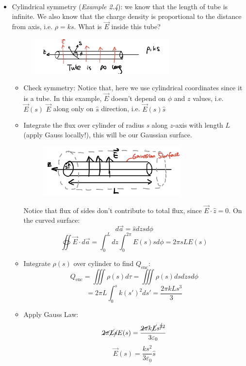 \documentclass[12pt,a4paper,twoside]{article}
\numberwithin{equation}{section}
\begin{document}
\begin{itemize}
        \item Cylindrical symmetry (\textit{Example 2.4}): we know that the length of tube is infinite. We also know that the charge density is proportional to the distance from axis, i.e. $\rho =ks$. What is $\overrightarrow{E}$ inside this tube?
        \begin{figure}[ht]
            \centering
            \includegraphics[width=7.5cm]{250-Revision/gauss-cylinder.png}
        \end{figure}
            \begin{itemize}
                \item Check symmetry:
                    \subitem Notice that, here we use cylindrical coordinates since it is a tube. In this example, $\overrightarrow{E}$ doesn't depend on $\phi$ and $z$ values, i.e. $\overrightarrow{E}(s)$
                    \subitem $\overrightarrow{E}$ along only on $\hat{s}$ direction, i.e. $\overrightarrow{E}(s)\hat{s}$
                \item Integrate the flux over cylinder of radius $s$ along $z$-axis with length $L$ (apply Gauss locally!), this will be our Gaussian surface.
                \begin{figure}[ht]
                    \centering
                    \includegraphics[width=7.5cm]{250-Revision/tube-gaussian-surface.png}
                \end{figure}
                    \subitem Notice that flux of sides don't contribute to total flux, since $\overrightarrow{E}\cdot \hat{z}=0$.
                    \subitem On the curved surface:
                    \[d\overrightarrow{a}=\hat{s}dzsd\phi\]
                    \[\oiint \overrightarrow{E}\cdot d\overrightarrow{a}=\int_{0}^{L}dz\int_{0}^{2\pi}E(s) sd\phi=2\pi sLE(s)\]
                \item Integrate $\rho(s)$ over cylinder to find $Q_{\mathrm{enc}}$:
                    \[Q_{\mathrm{enc}}=\iiint \rho(s)d\tau=\iiint \rho(s)dsdzsd\phi\]
                    \[=2\pi L\int_{0}^{s}k(s')^2ds'=\frac{2\pi kLs^3}{3}\]
                \item Apply Gauss Law:
                    \[\cancel{2\pi}\cancel{L}\cancel{s}E(s)=\frac{\cancel{2\pi} k\cancel{L}s^{\cancel{3}2}}{3\varepsilon_0}\]
                    \[\overrightarrow{E}(s)=\frac{ks^2}{3\varepsilon_0}\hat{s}\]
            \end{itemize}
            

\end{itemize}
\end{document}
